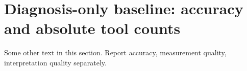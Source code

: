 \documentclass{article}
\begin{document}
\section{Diagnosis-only baseline: accuracy and absolute tool counts}
Some other text in this section.
\newpage
Report accuracy, measurement quality, interpretation quality separately.
\end{document}
